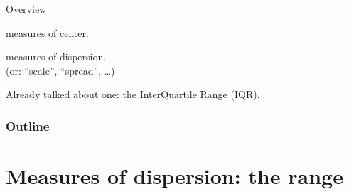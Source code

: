 %
%
%



\subtitle{What is the scale of the data?}

\date{22 January 2015}




\begin{frame}
  \maketitle
\end{frame}




\begin{frame}{Overview}

    measures of center.

    \vspace{3em}
    
    measures of dispersion. \\
    (or: ``scale'', ``spread'', \ldots)

    \vspace{3em}
    
    Already talked about one: the InterQuartile Range (IQR).

\end{frame}


\begin{frame}\frametitle<presentation>{Outline}
  \tableofcontents
\end{frame}


\section{Measures of dispersion: the range}


